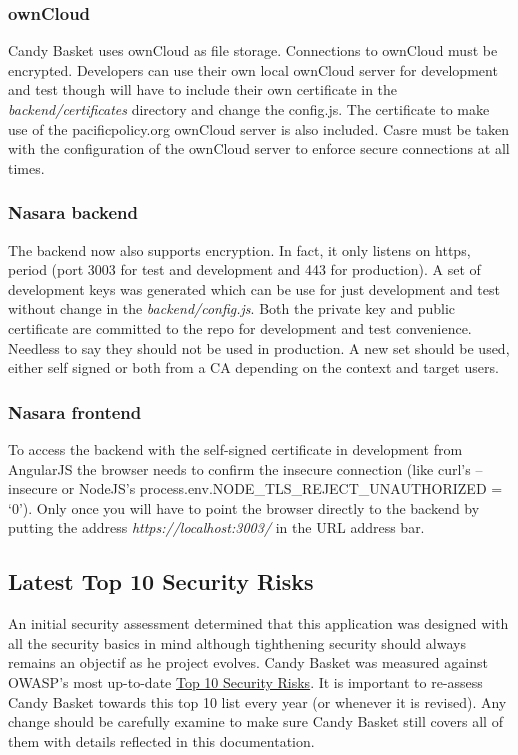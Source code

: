 \documentclass[letterpaper,10pt,english]{sphinxmanual}
\begin{document}
\subsubsection{ownCloud}
\label{developer-guide:owncloud}
Candy Basket uses ownCloud as file storage. Connections to ownCloud
must be encrypted. Developers can use their own local ownCloud server
for development and test though will have to include their own
certificate in the \emph{backend/certificates} directory and change the
config.js. The certificate to make use of the pacificpolicy.org
ownCloud server is also included. Casre must be taken with the
configuration of the ownCloud server to enforce secure connections at
all times.


\subsubsection{Nasara backend}
\label{developer-guide:nasara-backend}
The backend now also supports encryption. In fact, it only listens on
https, period (port 3003 for test and development and 443 for
production). A set of development keys was generated which can be use
for just development and test without change in the
\emph{backend/config.js}. Both the private key and public certificate are
committed to the repo for development and test convenience. Needless
to say they should not be used in production. A new set should be
used, either self signed or both from a CA depending on the context
and target users.


\subsubsection{Nasara frontend}
\label{developer-guide:nasara-frontend}
To access the backend with the self-signed certificate in development
from AngularJS the browser needs to confirm the insecure connection
(like curl's --insecure or NodeJS's
process.env.NODE\_TLS\_REJECT\_UNAUTHORIZED = `0'). Only once you will
have to point the browser directly to the backend by putting the
address \emph{https://localhost:3003/} in the URL address bar.


\subsection{Latest Top 10 Security Risks}
\label{developer-guide:latest-top-10-security-risks}
An initial security assessment determined that this application was
designed with all the security basics in mind although tighthening
security should always remains an objectif as he project
evolves. Candy Basket was measured against OWASP's most up-to-date
\href{https://owasp.org/index.php/Top\_10\_2013-Table\_of\_Contents}{Top 10 Security Risks}. It is
important to re-assess Candy Basket towards this top 10 list every
year (or whenever it is revised). Any change should be carefully
examine to make sure Candy Basket still covers all of them
with details reflected in this documentation.
\end{document}
